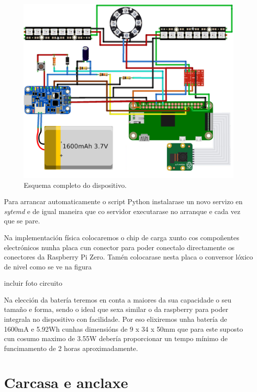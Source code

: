 \begin{itemize}
    \begin{figure}
      \centering
    	\includegraphics[scale=1]{imaxes/esquema-completo.png}
    	\caption{Esquema completo do dispositivo.}
    	\label{f:esquema do dispositivo}
    \end{figure}

    Para arrancar automaticamente o script Python instalarase un novo servizo en \emph{sytemd} e de igual maneira que co servidor executarase no arranque e cada vez que se pare.

    Na implementación física colocaremos o chip de carga xunto cos compoñentes electrónicos nunha placa cun conector para poder conectalo directamente os conectores da Raspberry Pi Zero. Tamén colocarase nesta placa o conversor lóxico de nivel como se ve na figura

    incluir foto circuito

    Na elección da batería teremos en conta a maiores da sua capacidade o seu tamaño e forma, sendo o ideal que sexa similar o da raspberry para poder integrala no dispositivo con facilidade. Por eso elixiremos unha batería de 1600mA e 5.92Wh cunhas dimensións de 9 x 34 x 50mm que para este suposto cun cosumo maximo de 3.55W debería proporcionar un tempo mínimo de funcimamento de 2 horas aproximadamente.

\end{itemize}

\section{Carcasa e anclaxe}

